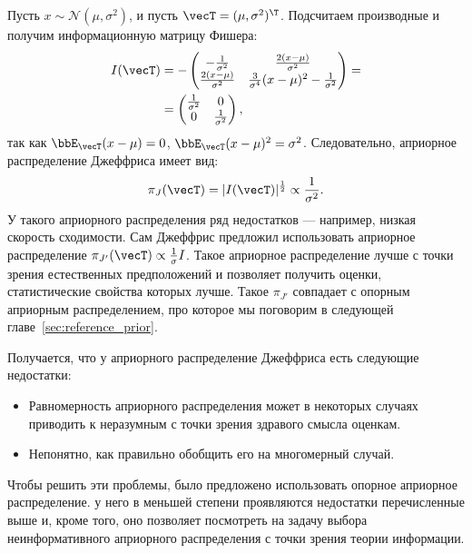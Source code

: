 \begin{example}
Пусть $x \sim \mathcal{N}(\mu, \sigma^2)$, и пусть $\vecT = (\mu, \sigma^2)^\T$.
Подсчитаем производные и получим информационную матрицу Фишера:
\begin{align*}
I(\vecT) &= -
\begin{pmatrix}
-\frac{1}{\sigma^2}           & \frac{2 (x - \mu)}{\sigma^2} \\
\frac{2 (x - \mu)}{\sigma^2} & \frac{3}{\sigma^4} (x - \mu)^2 - \frac{1}{\sigma^2} \\
\end{pmatrix} = \\
&= 
\begin{pmatrix}
\frac{1}{\sigma^2} & 0 \\
0 & \frac{1}{\sigma^2} \\
\end{pmatrix},
\end{align*}
так как $\bbE_{\vecT} (x - \mu) = 0$, $\bbE_{\vecT} (x - \mu)^2 = \sigma^2$.
Следовательно, априорное распределение Джеффриса имеет вид:
\[
\pi_J(\vecT) = |I(\vecT)|^{\frac12} \propto \frac{1}{\sigma^2}.
\]
У такого априорного распределения ряд недостатков --- например, низкая скорость сходимости.
Сам Джеффрис предложил использовать априорное распределение $\pi_{J'}(\vecT) \propto \frac{1}{\sigma} I$.
Такое априорное распределение лучше с точки зрения естественных предположений и позволяет получить оценки, статистические свойства которых лучше.
Такое $\pi_{J'}$ совпадает с опорным априорным распределением, про которое мы поговорим в следующей главе~\ref{sec:reference_prior}.
\end{example}

Получается, что у априорного распределение Джеффриса есть следующие недостатки:
\begin{itemize}
	\item Равномерность априорного распределения может в некоторых случаях приводить к неразумным с точки зрения здравого смысла оценкам.
	\item Непонятно, как правильно обобщить его на многомерный случай.
\end{itemize}

Чтобы решить эти проблемы, было предложено использовать опорное априорное распределение.
у него в меньшей степени проявляются недостатки перечисленные выше и, кроме того, оно позволяет посмотреть на задачу выбора неинформативного априорного распределения с точки зрения теории информации.